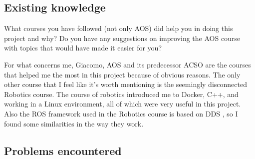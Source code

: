 \documentclass[10pt,a4]{article}
\begin{document}
\subsection{Existing knowledge}
What courses you have followed (not only AOS) did help you in doing this project
and why? Do you have any suggestions on improving the AOS course with topics
that would have made it easier for you?

For what concerns me, Giacomo, AOS and its predecessor ACSO are the courses that helped me the most in this project because of obvious reasons.
The only other course that I feel like it's worth mentioning is the seemingly disconnected Robotics course. The course of robotics introduced me
to Docker, C++, and working in a Linux environment, all of which were very useful in this project. Also the ROS framework used in the Robotics course
is based on DDS , so I found some similarities in the way they work.



\subsection{Problems encountered}
\end{document}
